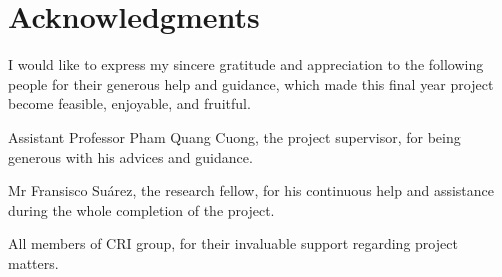 \chapter*{Acknowledgments}

I would like to express my sincere gratitude and appreciation to the following people for their generous help and guidance, which made this final year project become feasible, enjoyable, and fruitful. 

Assistant Professor Pham Quang Cuong, the project supervisor, for being generous with his advices and guidance.

Mr Fransisco Suárez, the research fellow, for his continuous help and assistance during the whole completion of the project.

All members of CRI group, for their invaluable support regarding project matters.

